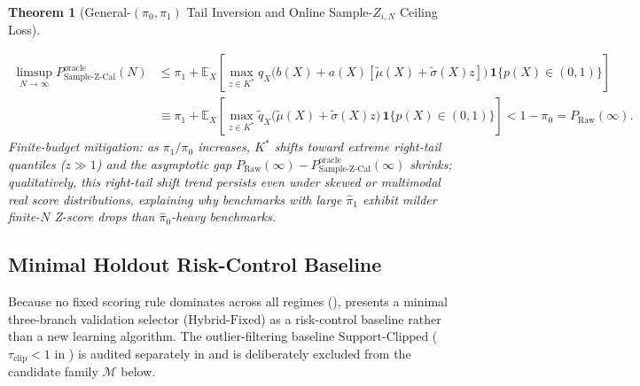 \documentclass[10pt]{article}
\theoremstyle{plain}
\newtheorem{theorem}{Theorem}
\theoremstyle{definition}
\theoremstyle{remark}
\newcommand{\E}{\mathbb{E}}
\newcommand{\ind}{\mathbf{1}}
\begin{document}
\begin{theorem}[General-$(\pi_0, \pi_1)$ Tail Inversion and Online Sample-$Z_{i,N}$ Ceiling Loss]
\begin{enumerate}[leftmargin=1.6em,itemsep=2pt,topsep=1pt]
    \begin{align}
    \limsup_{N \to \infty} P_{\mathrm{Sample\text{-}Z\text{-}Cal}}^{\mathrm{oracle}}(N)
    &\le \pi_1 + \E_X\!\left[\max_{z \in K^*} q_X\!\big(b(X) + a(X)[\tilde{\mu}(X) + \tilde{\sigma}(X)z]\big)\,\ind\{p(X)\in(0,1)\}\right] \nonumber\\
    &\equiv \pi_1 + \E_X\!\left[\max_{z \in K^*} \tilde{q}_X\!\big(\tilde{\mu}(X) + \tilde{\sigma}(X)z\big)\,\ind\{p(X)\in(0,1)\}\right] < 1 - \pi_0 = P_{\mathrm{Raw}}(\infty).
    \end{align}
    \emph{Finite-budget mitigation:} as $\pi_1/\pi_0$ increases, $K^*$ shifts toward extreme right-tail quantiles ($z \gg 1$) and the asymptotic gap $P_{\mathrm{Raw}}(\infty) - P_{\mathrm{Sample\text{-}Z\text{-}Cal}}^{\mathrm{oracle}}(\infty)$ shrinks; qualitatively, this right-tail shift trend persists even under skewed or multimodal real score distributions, explaining why benchmarks with large $\hat{\pi}_1$ exhibit milder finite-$N$ Z-score drops than $\hat{\pi}_0$-heavy benchmarks.
\end{enumerate}
\end{theorem}

\subsection{Minimal Holdout Risk-Control Baseline}

Because no fixed scoring rule dominates across all regimes (),  presents a minimal three-branch validation selector ($\mathrm{Hybrid\text{-}Fixed}$) as a risk-control baseline rather than a new learning algorithm. The outlier-filtering baseline $\mathrm{Support\text{-}Clipped}$ ($\tau_{\mathrm{clip}} < 1$ in ) is audited separately in  and is deliberately excluded from the candidate family $\mathcal{M}$ below.
\end{document}
